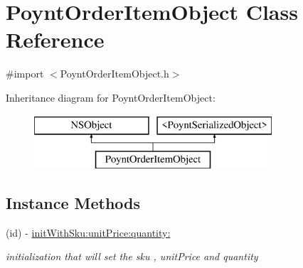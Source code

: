 \hypertarget{interface_poynt_order_item_object}{}\section{Poynt\+Order\+Item\+Object Class Reference}
\label{interface_poynt_order_item_object}


{\ttfamily \#import $<$Poynt\+Order\+Item\+Object.\+h$>$}

Inheritance diagram for Poynt\+Order\+Item\+Object\+:\begin{figure}[H]
\begin{center}
\leavevmode
\includegraphics[height=2.000000cm]{interface_poynt_order_item_object}
\end{center}
\end{figure}
\subsection*{Instance Methods}
\begin{DoxyCompactItemize}
\item 
(id) -\/ \hyperlink{interface_poynt_order_item_object_a9af033018e30ae4ea14b2425c449e443}{init\+With\+Sku\+:unit\+Price\+:quantity\+:}
\begin{DoxyCompactList}\small\item\em initialization that will set the sku , unit\+Price and quantity \end{DoxyCompactList}\end{DoxyCompactItemize}
